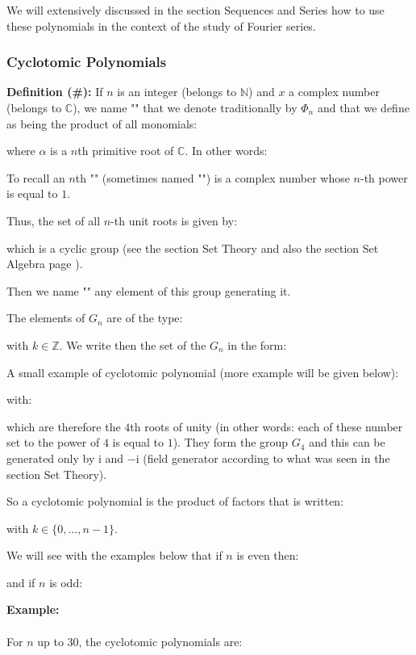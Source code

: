 	We will extensively discussed in the section Sequences and Series how to use these polynomials in the context of the study of Fourier series.
	
	\subsubsection{Cyclotomic Polynomials}
	\textbf{Definition (\#\mydef):} If $n$ is an integer (belongs to $\mathbb{N}$) and $x$ a complex number (belongs to $\mathbb{C}$), we name "" that we denote traditionally by $\Phi_n$ and that we define as being the product of all monomials:
	
	where $\alpha$ is a $n$th primitive root of $\mathbb{C}$. In other words:
	
	To recall an $n$th  "" (sometimes named "") is a complex number whose $n$-th power is equal to $1$.
	
	Thus, the set of all $n$-th unit roots is given by:
	
	which is a cyclic group (see the section Set Theory and also the section Set Algebra page \pageref{set algebra}).

	Then we name "" any element of this group generating it.
	
	The elements of $G_n$ are of the type:
	
	with $k\in \mathbb{Z}$. We write then the set of the $G_n$ in the form:
	
	A small example of cyclotomic polynomial (more example will be given below):
	
	with:
	
	which are therefore the $4$th roots of unity (in other words: each of these number set to the power of $4$ is equal to $1$). They form the group $G_4$ and this can be generated only by $\mathrm{i}$ and $-\mathrm{i}$ (field generator according to what was seen in the section Set Theory).
	
	So a cyclotomic polynomial is the product of factors that is written:
	
	with $k\in \{0,\ldots,n-1\}$.
	
	We will see with the examples below that if $n$ is even then:
	
	and if $n$ is odd:
	
	
	\pagebreak
	\begin{tcolorbox}[colframe=black,colback=white,sharp corners]
	\textbf{{\Large {}}Example:}\\\\
	For $n$ up to $30$, the cyclotomic polynomials are:
	
	\end{tcolorbox}
	
